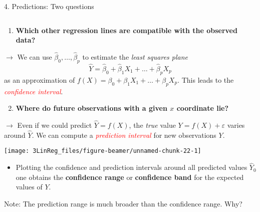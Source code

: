 \documentclass[10pt,ignorenonframetext,]{beamer}
\providecommand{\tightlist}{%
  \setlength{\itemsep}{0pt}\setlength{\parskip}{0pt}}
\begin{document}
\begin{frame}

\begin{block}{4. Predictions: Two questions}

\(~\)

\begin{enumerate}
\tightlist
\item
  \textbf{Which other regression lines are compatible with the observed
  data?}
\end{enumerate}

\vspace{2mm}

\(\rightarrow\) We can use \(\hat\beta_0, \ldots , \hat\beta_p\) to
estimate the \emph{least squares plane}
\[\hat{Y} = \hat\beta_0 + \hat\beta_1 X_1 + \ldots + \hat\beta_p X_p \]
as an approximation of
\(f(X) = \beta_0 + \beta_1 X_1 + \ldots + \beta_p X_p .\) This leads to
the \emph{\textcolor{red}{confidence interval}}.

\vspace{4mm}

\begin{enumerate}
\setcounter{enumi}{1}
\tightlist
\item
  \textbf{Where do future observations with a given \(x\) coordinate
  lie?}
\end{enumerate}

\vspace{2mm}

\(\rightarrow\) Even if we could predict \(\hat{Y}=f(X)\), the
\emph{true} value \(Y = f(X) + \varepsilon\) varies around \(\hat{Y}\).
We can compute a \emph{\textcolor{red}{prediction interval}} for new
observations \(Y\).

\end{block}

\end{frame}

\begin{frame}

\begin{center}\texttt{[image: 3LinReg\_files/figure-beamer/unnamed-chunk-22-1]} \end{center}

\begin{itemize}
\tightlist
\item
  Plotting the confidence and prediction intervals around all predicted
  values \(\hat Y_0\) one obtains the \textbf{confidence range} or
  \textbf{confidence band} for the expected values of \(Y\).
\end{itemize}

\vspace{2mm}

Note: The prediction range is much broader than the confidence range.
Why?

\end{frame}
\end{document}
